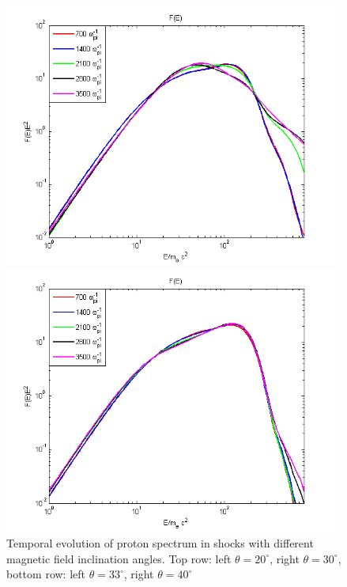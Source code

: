 \documentclass[a4paper]{jpconf}
\begin{document}
\begin{figure}[h!]
\begin{minipage}{0.47\textwidth}
		\includegraphics[width=0.98\textwidth]{fig/spectrump33.png} 
	\end{minipage}
	\begin{minipage}{0.47\textwidth}
		\centering
		\includegraphics[width=0.98\textwidth]{fig/spectrump40.png} 
	\end{minipage}
	\caption{Temporal evolution of proton spectrum in shocks with different magnetic field inclination angles. Top row: left $\theta = 20^\circ$, right $\theta = 30^\circ$, bottom row: left $\theta = 33^\circ$, right $\theta = 40^\circ$}
	\label{spectrump}
\end{figure}
	
\end{document}
